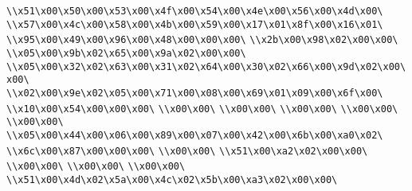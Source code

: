 \verb|\\x51\x00\x50\x00\x53\x00\x4f\x00\x54\x00\x4e\x00\x56\x00\x4d\x00\|\newline
\verb|\\x57\x00\x4c\x00\x58\x00\x4b\x00\x59\x00\x17\x01\x8f\x00\x16\x01\|\newline
\verb|\\x95\x00\x49\x00\x96\x00\x48\x00\x00\x00\|\newline
\verb|\\x2b\x00\x98\x02\x00\x00\|\newline
\verb|\\x05\x00\x9b\x02\x65\x00\x9a\x02\x00\x00\|\newline
\verb|\\x05\x00\x32\x02\x63\x00\x31\x02\x64\x00\x30\x02\x66\x00\x9d\x02\x00\x00\|\newline
\verb|\\x02\x00\x9e\x02\x05\x00\x71\x00\x08\x00\x69\x01\x09\x00\x6f\x00\|\newline
\verb|\\x10\x00\x54\x00\x00\x00\|\newline
\verb|\\x00\x00\|\newline
\verb|\\x00\x00\|\newline
\verb|\\x00\x00\|\newline
\verb|\\x00\x00\|\newline
\verb|\\x00\x00\|\newline
\verb|\\x05\x00\x44\x00\x06\x00\x89\x00\x07\x00\x42\x00\x6b\x00\xa0\x02\|\newline
\verb|\\x6c\x00\x87\x00\x00\x00\|\newline
\verb|\\x00\x00\|\newline
\verb|\\x51\x00\xa2\x02\x00\x00\|\newline
\verb|\\x00\x00\|\newline
\verb|\\x00\x00\|\newline
\verb|\\x00\x00\|\newline
\verb|\\x51\x00\x4d\x02\x5a\x00\x4c\x02\x5b\x00\xa3\x02\x00\x00\|\newline
